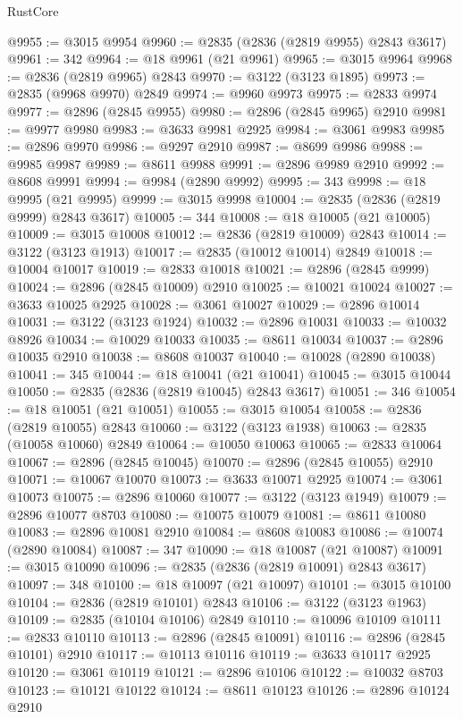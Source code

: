 \begin{lexlean}{RustCore}
\begin{coremodule}
@9955 := @3015 @9954
@9960 := @2835 (@2836 (@2819 @9955) @2843 @3617)
@9961 := 342
@9964 := @18 @9961 (@21 @9961)
@9965 := @3015 @9964
@9968 := @2836 (@2819 @9965) @2843
@9970 := @3122 (@3123 @1895)
@9973 := @2835 (@9968 @9970) @2849
@9974 := @9960 @9973
@9975 := @2833 @9974
@9977 := @2896 (@2845 @9955)
@9980 := @2896 (@2845 @9965) @2910
@9981 := @9977 @9980
@9983 := @3633 @9981 @2925
@9984 := @3061 @9983
@9985 := @2896 @9970
@9986 := @9297 @2910
@9987 := @8699 @9986
@9988 := @9985 @9987
@9989 := @8611 @9988
@9991 := @2896 @9989 @2910
@9992 := @8608 @9991
@9994 := @9984 (@2890 @9992)
@9995 := 343
@9998 := @18 @9995 (@21 @9995)
@9999 := @3015 @9998
@10004 := @2835 (@2836 (@2819 @9999) @2843 @3617)
@10005 := 344
@10008 := @18 @10005 (@21 @10005)
@10009 := @3015 @10008
@10012 := @2836 (@2819 @10009) @2843
@10014 := @3122 (@3123 @1913)
@10017 := @2835 (@10012 @10014) @2849
@10018 := @10004 @10017
@10019 := @2833 @10018
@10021 := @2896 (@2845 @9999)
@10024 := @2896 (@2845 @10009) @2910
@10025 := @10021 @10024
@10027 := @3633 @10025 @2925
@10028 := @3061 @10027
@10029 := @2896 @10014
@10031 := @3122 (@3123 @1924)
@10032 := @2896 @10031
@10033 := @10032 @8926
@10034 := @10029 @10033
@10035 := @8611 @10034
@10037 := @2896 @10035 @2910
@10038 := @8608 @10037
@10040 := @10028 (@2890 @10038)
@10041 := 345
@10044 := @18 @10041 (@21 @10041)
@10045 := @3015 @10044
@10050 := @2835 (@2836 (@2819 @10045) @2843 @3617)
@10051 := 346
@10054 := @18 @10051 (@21 @10051)
@10055 := @3015 @10054
@10058 := @2836 (@2819 @10055) @2843
@10060 := @3122 (@3123 @1938)
@10063 := @2835 (@10058 @10060) @2849
@10064 := @10050 @10063
@10065 := @2833 @10064
@10067 := @2896 (@2845 @10045)
@10070 := @2896 (@2845 @10055) @2910
@10071 := @10067 @10070
@10073 := @3633 @10071 @2925
@10074 := @3061 @10073
@10075 := @2896 @10060
@10077 := @3122 (@3123 @1949)
@10079 := @2896 @10077 @8703
@10080 := @10075 @10079
@10081 := @8611 @10080
@10083 := @2896 @10081 @2910
@10084 := @8608 @10083
@10086 := @10074 (@2890 @10084)
@10087 := 347
@10090 := @18 @10087 (@21 @10087)
@10091 := @3015 @10090
@10096 := @2835 (@2836 (@2819 @10091) @2843 @3617)
@10097 := 348
@10100 := @18 @10097 (@21 @10097)
@10101 := @3015 @10100
@10104 := @2836 (@2819 @10101) @2843
@10106 := @3122 (@3123 @1963)
@10109 := @2835 (@10104 @10106) @2849
@10110 := @10096 @10109
@10111 := @2833 @10110
@10113 := @2896 (@2845 @10091)
@10116 := @2896 (@2845 @10101) @2910
@10117 := @10113 @10116
@10119 := @3633 @10117 @2925
@10120 := @3061 @10119
@10121 := @2896 @10106
@10122 := @10032 @8703
@10123 := @10121 @10122
@10124 := @8611 @10123
@10126 := @2896 @10124 @2910

\end{coremodule}
\end{lexlean}
